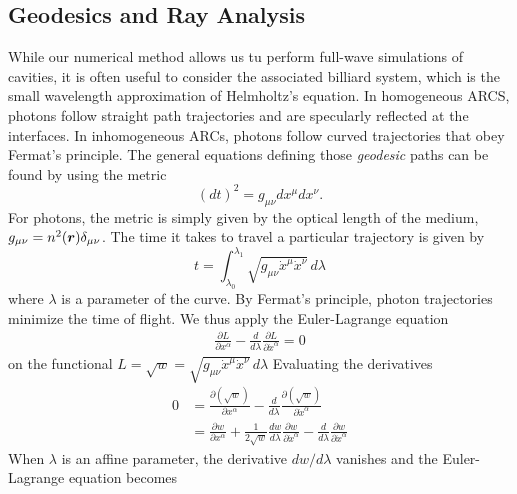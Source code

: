 \subsection{Geodesics and Ray Analysis}
While our numerical method allows us tu perform full-wave
simulations of cavities, it is often useful to consider the associated
billiard system, which is the small wavelength approximation of 
Helmholtz's equation. In homogeneous ARCS, photons follow straight path
trajectories and are specularly reflected at the interfaces. In inhomogeneous
ARCs, photons follow curved trajectories that obey Fermat's principle. 
The general equations defining those \textit{geodesic} paths can be found
by using the metric
  \begin{equation}
   (dt)^2=g_{\mu\nu}dx^\mu dx^\nu. 
  \end{equation}
For photons, the metric is simply given by the optical length 
of the medium, $g_{\mu\nu}=n^2(\boldsymbol{r})\delta_{\mu\nu}$. 
The time it takes to travel a particular trajectory is given by
  \begin{equation}
   t = \int_{\lambda_0}^{\lambda_1} \sqrt{g_{\mu\nu}\dot{x}^\mu\dot{x}^\nu}\,d\lambda
  \end{equation}
where $\lambda$ is a parameter of the curve. By Fermat's principle, photon 
trajectories minimize the time of flight. We thus apply the Euler-Lagrange
equation 
  \begin{align}
   \frac{\partial L}{\partial x^\alpha}-\frac{d}{d\lambda}\frac{\partial L}{\partial\dot{x}^\alpha}=0
  \end{align}
on the functional $L=\sqrt{w}=\sqrt{g_{\mu\nu}\dot{x}^\mu\dot{x}^\nu}\,d\lambda$ Evaluating the derivatives
  \begin{align*}
  0	&=\frac{\partial\left(\sqrt{w}\right)}{\partial x^\alpha}-\frac{d}{d\lambda}\frac{\partial\left(\sqrt{w}\right)}{\partial\dot{x}^\alpha}	\\
  {}	&=\frac{\partial w}{\partial x^\alpha}+\frac{1}{2\sqrt{w}}\frac{dw}{d\lambda}\frac{\partial w}{\partial\dot{x}^\alpha}-\frac{d}{d\lambda}\frac{\partial w}{\partial\dot{x}^\alpha}
  \end{align*}
When $\lambda$ is an affine parameter, the derivative $dw/d\lambda$ vanishes \cite{TOP2005,SCH2009}
and the Euler-Lagrange equation becomes
